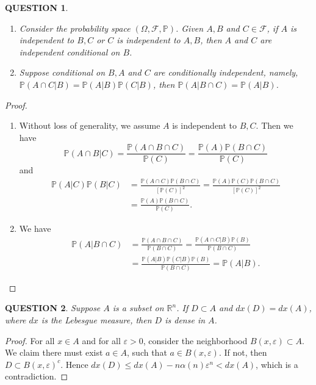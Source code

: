 \documentclass[12pt]{article}
\renewcommand{\(}{\left(}%
\renewcommand{\)}{\right)}%
\renewcommand{\[}{\left[}%
\renewcommand{\]}{\right]}%
\renewcommand{\r}{\mathbb{R}}
\newcommand{\p}{\mathbb{P}}
\newcommand{\f}{\mathscr{F}}
\newtheorem{question}{QUESTION}[section]}
\newtheorem{proof}{Proof.}}
\begin{document}
  \begin{question}
   \begin{enumerate}
    \item Consider the probability space $(\Omega,\f,\p)$. Given $A,B$ and $C\in\f$, if $A$ is independent to $B,C$ or $C$ is independent to $A,B$, then $A$ and $C$ are independent conditional on $B$.
    \item Suppose conditional on $B,A$ and $C$ are conditionally independent, namely, $\p(A\cap C|B)=\p(A|B)\p(C|B)$, then $\p(A|B\cap C)=\p(A|B)$.
   \end{enumerate}
  \end{question}
  \begin{proof}
   \begin{enumerate}
    \item Without loss of generality, we assume $A$ is independent to $B,C$. Then we have
    \begin{equation*}
     \p(A\cap B|C )=\frac{\p(A\cap B\cap C)}{\p(C)}=\frac{\p(A)\p(B\cap C)}{\p(C)}
    \end{equation*}
    and
    \begin{equation*}
     \begin{split}
      \p(A|C)\p(B|C)&=\frac{\p(A\cap C)\p(B\cap C)}{[\p(C)]^2}=\frac{\p(A)\p(C)\p(B\cap C)}{[\p(C)]^2}\\
      &=\frac{\p(A)\p(B\cap C)}{\p(C)}.
     \end{split}
    \end{equation*}
    \item We have
   \begin{equation*}
    \begin{split}
     \p(A|B\cap C)&=\frac{\p(A\cap B\cap C)}{\p(B\cap C)}=\frac{\p(A\cap C|B)\p(B)}{\p(B\cap C)}\\
     &=\frac{\p(A|B)\p(C|B)\p(B)}{\p(B\cap C)}=\p(A|B).
    \end{split}
   \end{equation*}
   \end{enumerate}
  \end{proof}

  \begin{question}
   Suppose $A$ is a subset on $\r^n$. If $D\subset A$ and $dx(D)=dx(A)$, where $dx$ is the Lebesgue measure, then $D$ is dense in $A$.
  \end{question}
  \begin{proof}
   For all $x\in A$ and for all $\varepsilon>0$, consider the neighborhood $B(x,\varepsilon )\subset A$. We claim there must exist $a\in A$, such that $a\in B(x,\varepsilon )$. If not, then $D\subset B(x,\varepsilon )^c$. Hence $dx(D)\leq dx(A)-n\alpha(n)\varepsilon^n<dx(A)$, which is a contradiction.
  \end{proof}
\end{document}
